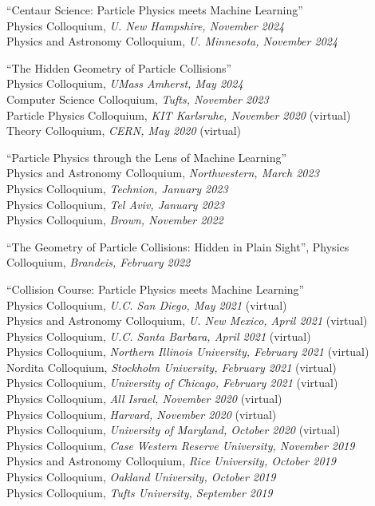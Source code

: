 \bbl

\item ``Centaur Science:  Particle Physics meets Machine Learning''
\\ Physics Colloquium, \emph{U. New Hampshire, November 2024}
\\ Physics and Astronomy Colloquium, \emph{U. Minnesota, November 2024}

\item ``The Hidden Geometry of Particle Collisions''
\\ Physics Colloquium, \emph{UMass Amherst, May 2024}
\\ Computer Science Colloquium, \emph{Tufts, November 2023}
\\ Particle Physics Colloquium, \emph{KIT Karlsruhe, November 2020} (virtual)
\\ Theory Colloquium, \emph{CERN, May 2020} (virtual)

\item ``Particle Physics through the Lens of Machine Learning''
\\ Physics and Astronomy Colloquium, \emph{Northwestern, March 2023}
\\ Physics Colloquium, \emph{Technion, January 2023}
\\ Physics Colloquium, \emph{Tel Aviv, January 2023}
\\ Physics Colloquium, \emph{Brown, November 2022}

\item ``The Geometry of Particle Collisions: Hidden in Plain Sight'', Physics Colloquium, \emph{Brandeis, February 2022}

\item ``Collision Course:  Particle Physics meets Machine Learning''
\\ Physics Colloquium, \emph{U.C. San Diego, May 2021} (virtual)
\\ Physics and Astronomy Colloquium, \emph{U. New Mexico, April 2021} (virtual)
\\ Physics Colloquium, \emph{U.C. Santa Barbara, April 2021} (virtual)
\\ Physics Colloquium, \emph{Northern Illinois University, February 2021} (virtual)
\\ Nordita Colloquium, \emph{Stockholm University, February 2021} (virtual)
\\ Physics Colloquium, \emph{University of Chicago, February 2021} (virtual)
\\ Physics Colloquium, \emph{All Israel, November 2020} (virtual)
\\ Physics Colloquium, \emph{Harvard, November 2020} (virtual)
\\ Physics Colloquium, \emph{University of Maryland, October 2020} (virtual)
\\ Physics Colloquium, \emph{Case Western Reserve University, November 2019}
\\ Physics and Astronomy Colloquium, \emph{Rice University, October 2019}
\\ Physics Colloquium, \emph{Oakland University, October 2019}
\\ Physics Colloquium, \emph{Tufts University, September 2019}

